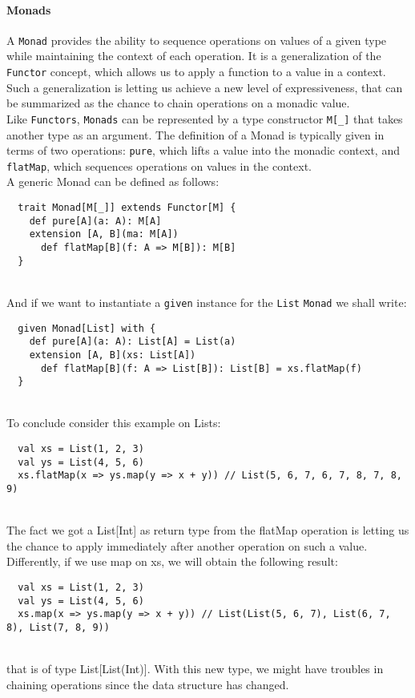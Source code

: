 \paragraph{Monads}
A \texttt{Monad} provides the ability to sequence operations on values of a given type while maintaining the context of each operation.
It is a generalization of the \texttt{Functor} concept, which allows us to apply a function to a value in a context.
Such a generalization is letting us achieve a new level of expressiveness, that can be summarized as the chance to chain operations on a monadic value.\\
Like \texttt{Functors}, \texttt{Monads} can be represented by a type constructor \texttt{M[\_]} that takes another type as an argument.
The definition of a Monad is typically given in terms of two operations: \texttt{pure}, which lifts a value into the monadic context, and \texttt{flatMap}, which sequences operations on values in the context.\\
A generic Monad can be defined as follows:
\begin{verbatim}
  trait Monad[M[_]] extends Functor[M] {
    def pure[A](a: A): M[A]
    extension [A, B](ma: M[A])
      def flatMap[B](f: A => M[B]): M[B]
  }
\end{verbatim}\mbox{}\\
And if we want to instantiate a \texttt{given} instance for the \texttt{List} \texttt{Monad} we shall write:
\begin{verbatim}
  given Monad[List] with {
    def pure[A](a: A): List[A] = List(a)
    extension [A, B](xs: List[A])
      def flatMap[B](f: A => List[B]): List[B] = xs.flatMap(f)
  }
\end{verbatim}\mbox{}\\
To conclude consider this example on Lists:
\begin{verbatim}
  val xs = List(1, 2, 3)
  val ys = List(4, 5, 6)
  xs.flatMap(x => ys.map(y => x + y)) // List(5, 6, 7, 6, 7, 8, 7, 8, 9)
\end{verbatim}\mbox{}\\
The fact we got a List[Int] as return type from the flatMap operation is letting us the chance to apply immediately after another operation on such a value.
Differently, if we use map on xs, we will obtain the following result:
\begin{verbatim}
  val xs = List(1, 2, 3)
  val ys = List(4, 5, 6)
  xs.map(x => ys.map(y => x + y)) // List(List(5, 6, 7), List(6, 7, 8), List(7, 8, 9))
\end{verbatim}\mbox{}\\
that is of type List[List(Int)]. With this new type, we might have troubles in chaining operations since the data structure has changed.

